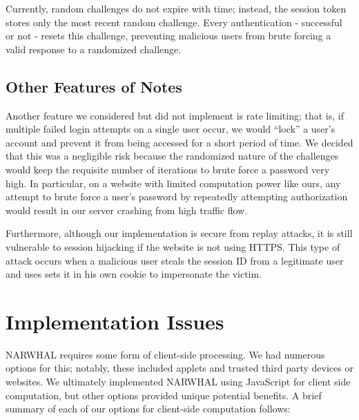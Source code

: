 \documentclass[11pt]{article}
\begin{document}
Currently, random challenges do not expire with time; instead, the session token stores only the most recent random challenge. Every authentication - successful or not - resets this challenge, preventing malicious users from brute forcing a valid response to a randomized challenge.

\subsection{Other Features of Notes}

Another feature we considered but did not implement is rate limiting; that is, if multiple failed login attempts on a single user occur, we would “lock” a user’s account and prevent it from being accessed for a short period of time. We decided that this was a negligible risk because the randomized nature of the challenges would keep the requisite number of iterations to brute force a password very high. In particular, on a website with limited computation power like ours, any attempt to brute force a user’s password by repeatedly attempting authorization would result in our server crashing from high traffic flow.

Furthermore, although our implementation is secure from replay attacks, it is still vulnerable to session hijacking if the website is not using HTTPS. This type of attack occurs when a malicious user steals the session ID from a legitimate user and uses sets it in his own cookie to impersonate the victim.

\section{Implementation Issues}
NARWHAL requires some form of client-side processing. We had numerous options for this; notably, these included applets and trusted third party devices or websites. We ultimately implemented NARWHAL using JavaScript for client side computation, but other options provided unique potential benefits. A brief summary of each of our options for client-side computation follows:
\end{document}
